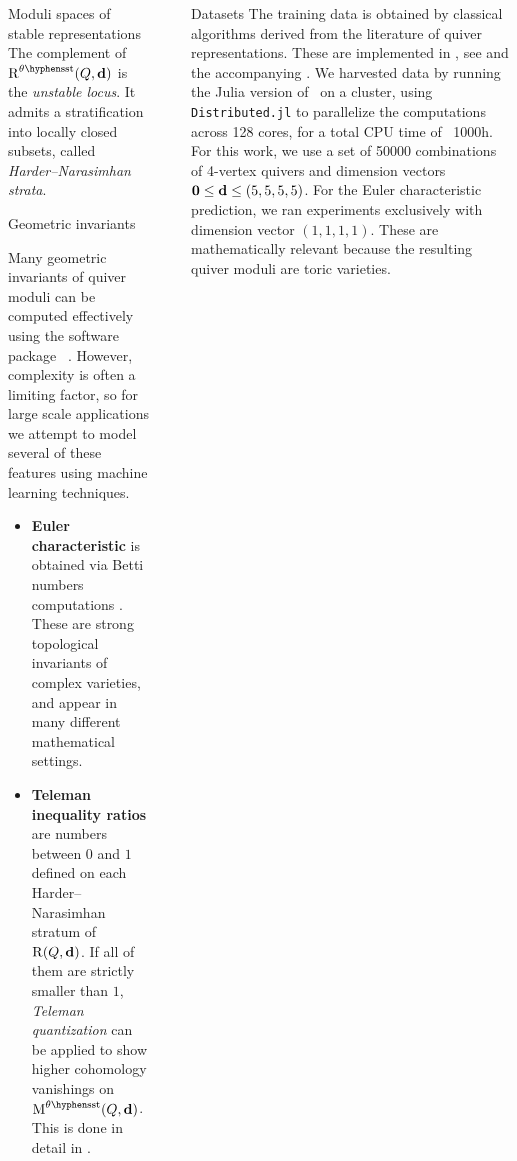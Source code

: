 \documentclass[final,20pt]{beamer}
\newlength{\sepwidth}
\newlength{\colwidth}
\newcommand{\separatorcolumn}{\begin{column}{\sepwidth}\end{column}}
\begin{document}
\begin{frame}[t, fragile]
\begin{columns}[t]
\begin{column}{\colwidth}
\begin{block}{Moduli spaces of stable representations}
    The complement of $\repspace^{\theta\semistable}(Q,\tuple{d})$ is the
    \emph{unstable locus}. It admits a stratification into locally closed
    subsets, called \emph{Harder--Narasimhan strata}.
  \end{block}

  \begin{alertblock}{Geometric invariants}

    Many geometric invariants of quiver moduli can be computed effectively
    using the software package \quivertools~\cite{quivertools,2506.19432}.
    However, complexity is often a limiting factor,
    so for large scale applications we attempt to model
    several of these features using machine learning techniques.

    \begin{itemize}
      \item \textbf{Euler characteristic} is obtained
      via Betti numbers computations \cite{MR1974891}.
      These are strong topological invariants of complex varieties,
      and appear in many different mathematical settings.

      \item \textbf{Teleman inequality ratios} are numbers between $0$ and $1$ defined
      on each Harder--Narasimhan stratum of $\operatorname{R}(Q,\mathbf{d})$.
      If all of them are strictly smaller than $1$,
      \emph{Teleman quantization} can be applied to show higher cohomology vanishings
      on $\modulispace^{\theta\semistable}(Q,\tuple{d})$.
      This is done in detail in \cite{2311.17003}.
    \end{itemize}

  \end{alertblock}
\end{column}

\separatorcolumn

\begin{column}{\colwidth}


  \begin{block}{Datasets}
    The training data is obtained by classical algorithms derived from
    the literature of quiver representations. These are implemented in
    \quivertools, see \cite{quivertools} and the accompanying \cite{2506.19432}.
    We harvested data by running the Julia version of \quivertools~on a cluster,
    using {\tt{Distributed.jl}} to parallelize the computations across 128 cores,
    for a total CPU time of ~1000h.
    For this work, we use a set of 50000 combinations of 4-vertex quivers
    and dimension vectors $\mathbf{0} \leq \mathbf{d}\leq(5, 5, 5, 5)$.
    For the Euler characteristic prediction, we ran experiments
    exclusively with dimension vector $(1, 1, 1, 1)$.
    These are mathematically relevant because the resulting quiver moduli
    are toric varieties.
  \end{block}


\end{column}
\end{columns}
\end{frame}
\end{document}

